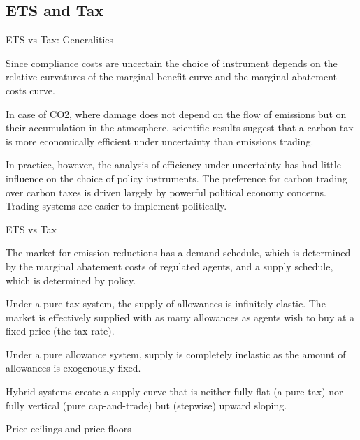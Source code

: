 






\subsection{ETS and Tax}

{ETS vs Tax: Generalities}






	Since compliance costs are uncertain the choice of instrument depends on the relative curvatures
of the marginal benefit curve and the marginal abatement costs curve.


	In case of CO2, where damage does not depend on the flow of emissions but on their accumulation in
the atmosphere, scientific results suggest that a carbon tax is more economically efficient under
uncertainty than emissions trading.


	In practice, however, the analysis of efficiency
under uncertainty has had little influence on the choice of policy instruments. The preference
for carbon trading over carbon taxes is driven largely by powerful political economy concerns.
Trading systems are easier to implement politically.

{ETS vs Tax}






	The market for emission
reductions has a demand schedule, which is determined by the marginal abatement costs of
regulated agents, and a supply schedule, which is determined by policy.


	Under a pure tax
system, the supply of allowances is infinitely elastic. The market is effectively supplied with as
many allowances as agents wish to buy at a fixed price (the tax rate).


	Under a pure allowance
system, supply is completely inelastic as the amount of allowances is exogenously fixed.


	Hybrid systems create a supply curve that is neither fully flat (a pure tax) nor fully vertical
(pure cap-and-trade) but (stepwise) upward sloping.





{Price ceilings and price floors}






